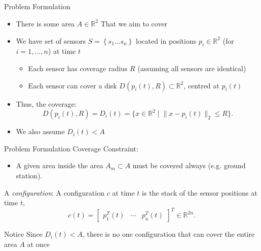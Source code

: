 \documentclass[t]{beamer}
\newcommand{\rR}{\mathbb{R}}
\newcommand{\rsqr}{\mathbb{R}^2}
\newcommand{\bmat}[1]{\begin{bmatrix}#1\end{bmatrix}}
\newcommand{\norm}[1]{\lVert #1 \rVert}
\begin{document}
\subsection[Problem Formulation]{}
\begin{frame}[label=formulation]{Problem Formulation}
\begin{itemize}
\item There is some area $A \in \rR^{2}$ That we aim to cover
\item We have set of sensors $S = \left\{s_1 \ldots s_n\right\}$ located in positions $p_i \in \mathbb{R}^2$ (for $i=1,\ldots,n$) at time $t$
\begin{itemize}
\item Each sensor has coverage radius $R$ (assuming all sensors are identical)
\item Each sensor can cover a disk $D\left(p_{i}\left(t\right), R\right)\subset \rsqr$, centred at $p_{i} \left( t \right)$
\end{itemize}
\item Thus, the coverage: \begin{equation}
D\left(p_{i}\left(t\right),R\right) = D_{i}\left(t\right) = \{ x\in\rsqr \mid \lVert x - p_{i}\left(t\right) \rVert_{2} \leq R \}.
\end{equation}
\item We also assume $D_{i}\left(t\right) < A$
\end{itemize}
\end{frame}

\begin{frame}[label=formulation2]{Problem Formulation}
Coverage Constraint:
\begin{itemize}
\item A given area inside the area $A_{m} \subset A$ must be covered always (e.g. ground station).
\end{itemize}
A \emph{configuration}: A configuration $c$ at time $t$ is the stack of the sensor positions at time $t$,
\begin{equation}
c\left(t\right) = \bmat{
p_{1}^{T}\left(t\right)&\cdots&p_{n}^{T}\left(t\right)}^{T}\in\mathbb{R}^{2n}.
\end{equation}
\begin{alertblock}{Notice}
Since $D_{i}\left( t \right) < A$, there is no one configuration that can cover the entire area $A$ at once
\end{alertblock}
\end{frame}
\end{document}
